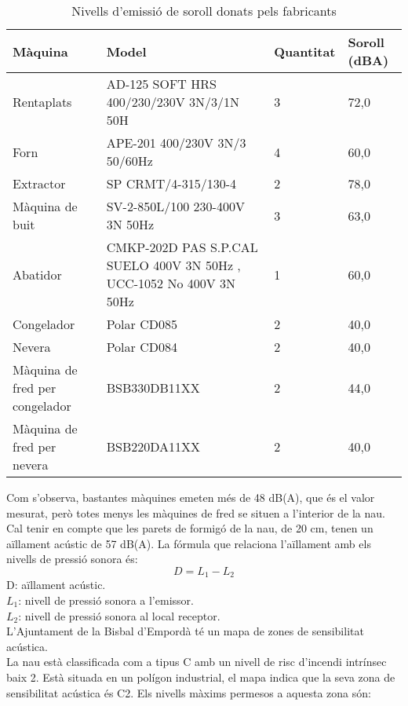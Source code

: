 \begin{table}[H]
\small
\begin{center}
 \begin{tabu} to \textwidth {|X[l]|X[2, l]|X[0.6, r]|X[0.5, r]|}
 \hline
Màquina & Model & Quantitat & Soroll (dBA) \\
 \hline \hline 
Rentaplats & AD-125 SOFT HRS 400/230/230V 3N/3/1N 50H & 3 & 72,0 \\ \hline
Forn & APE-201 400/230V 3N/3 50/60Hz & 4 & 60,0 \\ \hline
Extractor & SP CRMT/4-315/130-4 & 2 & 78,0 \\ \hline
Màquina de buit & SV-2-850L/100 230-400V 3N 50Hz & 3 & 63,0 \\ \hline
Abatidor & CMKP-202D PAS S.P.CAL SUELO 400V 3N 50Hz , UCC-1052 No 400V 3N 50Hz & 1 & 60,0 \\ \hline
Congelador & Polar CD085 & 2 & 40,0 \\ \hline
Nevera & Polar CD084 & 2 & 40,0 \\ \hline
Màquina de fred per congelador & BSB330DB11XX & 2 & 44,0 \\ \hline
Màquina de fred per nevera & BSB220DA11XX & 2 & 40,0 \\ \hline
 \end{tabu}
 \caption{Nivells d'emissió de soroll donats pels fabricants}
\end{center}
\end{table}
\noindent Com s'observa, bastantes màquines emeten més de 48 dB(A), que és el valor mesurat, però totes menys les màquines de fred se situen a l'interior de la nau. Cal tenir en compte que les parets de formigó de la nau, de 20 cm, tenen un aïllament acústic de 57 dB(A). La fórmula que relaciona l'aïllament amb els nivells de pressió sonora és:
\begin{equation}
D = L_1 - L_2
\end{equation}
\noindent D: aïllament acústic.\\
$L_1$: nivell de pressió sonora a l'emissor.\\
$L_2$: nivell de pressió sonora al local receptor.\\
%
%
%
%
%
%
\newline L'Ajuntament de la Bisbal d'Empordà té un mapa de zones de sensibilitat acústica.\\
\newline La nau està classificada com a tipus C amb un nivell de risc d'incendi intrínsec baix 2. Està situada en un polígon industrial, el mapa indica que la seva zona de sensibilitat acústica és C2. Els nivells màxims permesos a aquesta zona són:
